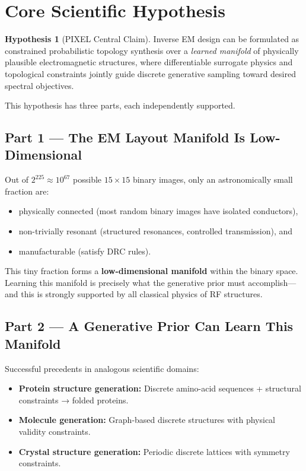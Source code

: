 \documentclass[12pt,a4paper]{article}
\theoremstyle{definition}
\newtheorem{hypothesis}{Hypothesis}[section]
\theoremstyle{plain}
\theoremstyle{remark}
\begin{document}
\section{Core Scientific Hypothesis}
\label{sec:hypothesis}

\begin{hypothesis}[PIXEL Central Claim]
\label{hyp:main}
Inverse EM design can be formulated as constrained probabilistic topology synthesis
over a \emph{learned manifold} of physically plausible electromagnetic structures,
where differentiable surrogate physics and topological constraints jointly guide
discrete generative sampling toward desired spectral objectives.
\end{hypothesis}

This hypothesis has three parts, each independently supported.

\subsection{Part 1 — The EM Layout Manifold Is Low-Dimensional}

Out of $2^{225} \approx 10^{67}$ possible $15\times15$ binary images, only an
astronomically small fraction are:
\begin{itemize}
  \item physically connected (most random binary images have isolated conductors),
  \item non-trivially resonant (structured resonances, controlled transmission), and
  \item manufacturable (satisfy DRC rules).
\end{itemize}

This tiny fraction forms a \textbf{low-dimensional manifold} within the binary space.
Learning this manifold is precisely what the generative prior must accomplish—and this
is strongly supported by all classical physics of RF structures.

\subsection{Part 2 — A Generative Prior Can Learn This Manifold}

Successful precedents in analogous scientific domains:
\begin{itemize}
  \item \textbf{Protein structure generation:} Discrete amino-acid sequences + structural constraints → folded proteins.
  \item \textbf{Molecule generation:} Graph-based discrete structures with physical validity constraints.
  \item \textbf{Crystal structure generation:} Periodic discrete lattices with symmetry constraints.
\end{itemize}
\end{document}

